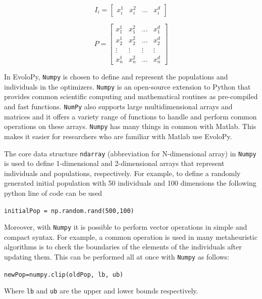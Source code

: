\documentclass[a4paper,twoside]{article}
\begin{document}
\begin{equation}
I_{i}=[\begin{array}{cccc}
x_{i}^{1} & x_{i}^{2} & ... & x_{i}^{d}\end{array}]
\label{eq:individual}
\end{equation}

\begin{equation}
P=\left[\begin{array}{cccc}
x_{1}^{1} & x_{1}^{2} & ... & x_{1}^{d}\\
x_{2}^{1} & x_{2}^{2} & ... & x_{2}^{d}\\
\vdots & \vdots & \vdots & \vdots\\
x_{n}^{1} & x_{n}^{2} & ... & x_{n}^{d}
\end{array}\right]
\label{eq:population}
\end{equation}

In EvoloPy, \texttt{Numpy} is chosen to define and represent the populations and individuals in the optimizers. \texttt{Numpy} is an open-source extension to Python that provides common scientific computing and mathematical routines as pre-compiled and fast functions. \texttt{NumPy} also supports large multidimensional arrays and matrices and it offers a variety range of functions to handle and perform common operations on these arrays. \texttt{Numpy} has many things in common with Matlab. This makes it easier for researchers who are familiar with Matlab use EvoloPy. 

The core data structure \texttt{ndarray} (abbreviation for N-dimensional array) in \texttt{Numpy} is used to define 1-dimensional and 2-dimensional arrays that represent individuals and populations, respectively. For example, to define a randomly generated initial population with 50 individuals and 100 dimensions the following python line of code can be used

\texttt{initialPop = np.random.rand(500,100)}


Moreover, with \texttt{Numpy} it is possible to perform vector operations in simple and compact syntax. For example, a common operation is used in many metaheuristic algorithms is to check the boundaries of the elements of the individuals after updating them. This can be performed all at once with \texttt{Numpy} as follows:

\texttt{newPop=numpy.clip(oldPop, lb, ub)}

Where \texttt{lb} and \texttt{ub} are the upper and lower bounds respectively.
\end{document}
